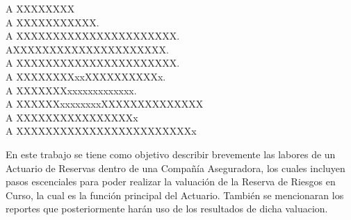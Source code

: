 \documentclass[11pt,twoside,openright,spanish]{report}
\numberwithin{equation}{chapter}
\numberwithin{figure}{chapter}
\numberwithin{table}{chapter}
\begin{document}
	\begin{acknowledgements}
	 
	A XXXXXXXX
	\\

	A XXXXXXXXXXX.
	\\
	
	A XXXXXXXXXXXXXXXXXXXXXX.
	\\
	
	AXXXXXXXXXXXXXXXXXXXXX.
	\\
	
	A XXXXXXXXXXXXXXXXXXXXXX.
	\\
	
	A XXXXXXXXxxXXXXXXXXXXx.
	\\
	
	A XXXXXXXxxxxxxxxxxxxx.   
	\\
	
	A XXXXXXxxxxxxxxXXXXXXXXXXXXXX
	\\
	
	A XXXXXXXXXXXXXXXXx
	\\
	
	A XXXXXXXXXXXXXXXXXXXXXXXXx
	\\
	
		
	\end{acknowledgements}
	
	
	\tableofcontents
	
	
	\addtolength{\headheight}{\baselineskip}
	\pagestyle{fancy}
	\cleardoublepage
		
	\begin{preface}
	\doublespacing
	
	En este trabajo se tiene como objetivo describir brevemente las labores de un Actuario de Reservas dentro de una Compañía Aseguradora, los cuales incluyen pasos escenciales para poder realizar la valuación de la Reserva de Riesgos en Curso, la cual es la función principal del Actuario. También se mencionaran los reportes que posteriormente harán uso de los resultados de dicha valuacion.
		
	\end{preface}
	
	
\end{document}
